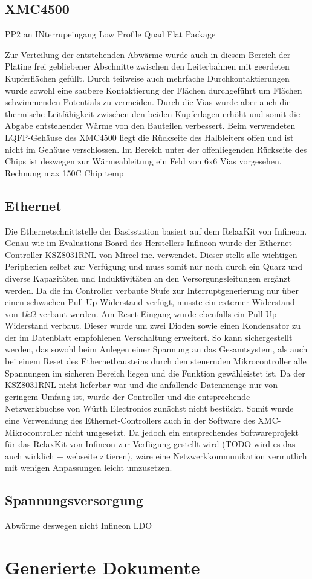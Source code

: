 \subsection{XMC4500}
PP2 an INterrupeingang
Low Profile Quad Flat Package

Zur Verteilung der entstehenden Abwärme wurde auch in diesem Bereich der Platine  frei gebliebener Abschnitte zwischen den Leiterbahnen mit geerdeten Kupferflächen gefüllt. Durch teilweise auch mehrfache Durchkontaktierungen wurde sowohl eine saubere Kontaktierung der Flächen durchgeführt um Flächen schwimmenden Potentials zu vermeiden. Durch die Vias wurde aber auch die thermische Leitfähigkeit zwischen den beiden Kupferlagen erhöht und somit die Abgabe entstehender Wärme von den Bauteilen verbessert. Beim verwendeten LQFP-Gehäuse des XMC4500 liegt die Rückseite des Halbleiters offen und ist nicht im Gehäuse verschlossen. Im Bereich unter der offenliegenden Rückseite des Chips ist deswegen zur Wärmeableitung ein Feld von 6x6 Vias vorgesehen. 
Rechnung 
max 150C Chip temp


\subsection{Ethernet}
Die Ethernetschnittstelle der Basisstation basiert auf dem RelaxKit von Infineon. Genau wie im Evaluations Board des Herstellers Infineon wurde der Ethernet-Controller KSZ8031RNL von Mircel inc. verwendet. Dieser stellt alle wichtigen Peripherien selbst zur Verfügung und muss somit nur noch durch ein Quarz und diverse Kapazitäten und Induktivitäten an den Versorgungsleitungen ergänzt werden. Da die im Controller verbaute Stufe zur Interruptgenerierung nur über einen schwachen Pull-Up Widerstand verfügt, musste ein externer Widerstand von $1k\Omega$ verbaut werden. Am Reset-Eingang wurde ebenfalls ein Pull-Up Widerstand verbaut. Dieser wurde um zwei Dioden sowie einen Kondensator zu der im Datenblatt empfohlenen Verschaltung erweitert. So kann sichergestellt werden, das sowohl beim Anlegen einer Spannung an das Gesamtsystem, als auch bei einem Reset des Ethernetbausteins durch den steuernden Mikrocontroller alle Spannungen im sicheren Bereich liegen und die Funktion gewähleistet ist. 
Da der KSZ8031RNL  nicht lieferbar war und die anfallende Datenmenge nur von geringem Umfang ist, wurde der Controller und die entsprechende Netzwerkbuchse von Würth Electronics zunächst nicht bestückt. Somit wurde eine Verwendung des Ethernet-Controllers auch in der Software des XMC-Mikrocontroller nicht umgesetzt. Da jedoch ein entsprechendes Softwareprojekt für das RelaxKit von Infineon zur Verfügung gestellt wird (TODO wird es das auch wirklich + webseite zitieren), wäre eine Netzwerkkommunikation vermutlich mit wenigen Anpassungen leicht umzusetzen. 








\subsection{Spannungsversorgung}

Abwärme deswegen nicht Infineon LDO
\section{Generierte Dokumente}